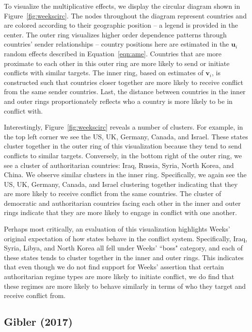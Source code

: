 To visualize the multiplicative effects, we display the circular diagram shown in Figure~\ref{fig:weekscirc}. The nodes throughout the diagram represent countries and are colored according to their geographic position -- a legend is provided in the center. The outer ring visualizes higher order dependence patterns through countries' sender relationships -- country positions here are estimated in the $\mathbf{u}_{i}$ random effects described in Equation~\ref{eqn:ame}. Countries that are more proximate to each other in this outer ring are more likely to send or initiate conflicts with similar targets. The inner ring, based on estimates of $\mathbf{v}_{i}$, is constructed such that countries closer together are more likely to receive conflict from the same sender countries. Last, the distance between countries in the inner and outer rings proportionately reflects who a country is more likely to be in conflict with. 

Interestingly, Figure~\ref{fig:weekscirc} reveals a number of clusters. For example, in the top left corner we see the US, UK, Germany, Canada, and Israel. These states cluster together in the outer ring of this visualization because they tend to send conflicts to similar targets. Conversely, in the bottom right of the outer ring, we see a cluster of authoritarian countries: Iraq, Russia, Syria, North Korea, and China. We observe similar clusters in the inner ring. Specifically, we again see the US, UK, Germany, Canada, and Israel clustering together indicating that they are more likely to receive conflict from the same countries.  The  cluster of democratic and authoritarian countries facing each other in the inner and outer rings indicate that they are more likely to engage in conflict with one another. 

Perhaps most critically, an evaluation of this visualization highlights Weeks' original expectation of how states behave in the conflict system.  Specifically, Iraq, Syria, Libya, and North Korea all fell under Weeks' ``boss" category, and each of these states tends to cluster together in the inner and outer rings. This indicates that even though we do not find support for Weeks' assertion that certain authoritarian regime types are more likely to initiate conflict, we do find that these regimes are more likely to behave similarly in terms of who they target and receive conflict from. 

\subsection{Gibler (2017)}

